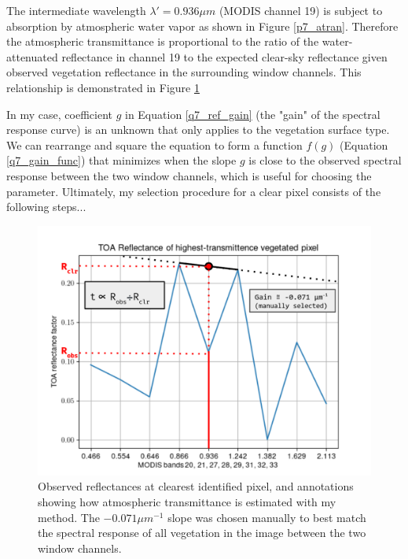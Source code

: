 \documentclass[12pt]{article}
\begin{document}
The intermediate wavelength $\lambda'=0.936\mu m$ (MODIS channel 19) is subject to absorption by atmospheric water vapor as shown in Figure \ref{p7_atran}. Therefore the atmospheric transmittance is proportional to the ratio of the water-attenuated reflectance in channel 19 to the expected clear-sky reflectance given observed vegetation reflectance in the surrounding window channels. This relationship is demonstrated in Figure \ref{p7_ref_graph}

In my case, coefficient $g$ in Equation \ref{q7_ref_gain} (the "gain" of the spectral response curve) is an unknown that only applies to the vegetation surface type. We can rearrange and square the equation to form a function $f(g)$ (Equation \ref{q7_gain_func}) that minimizes when the slope $g$ is close to the observed spectral response between the two window channels, which is useful for choosing the parameter. Ultimately, my selection procedure for a clear pixel consists of the following steps...

\clearpage

\begin{figure}[h!]
    \centering
        \includegraphics[width=.8\linewidth]{figures/trans_ref_annotated.png}

    \caption{Observed reflectances at clearest identified pixel, and annotations showing how atmospheric transmittance is estimated with my method. The $-0.071\mu m^{-1}$ slope was chosen manually to best match the spectral response of all vegetation in the image between the two window channels.}
    \label{p7_ref_graph}
\end{figure}
\end{document}
